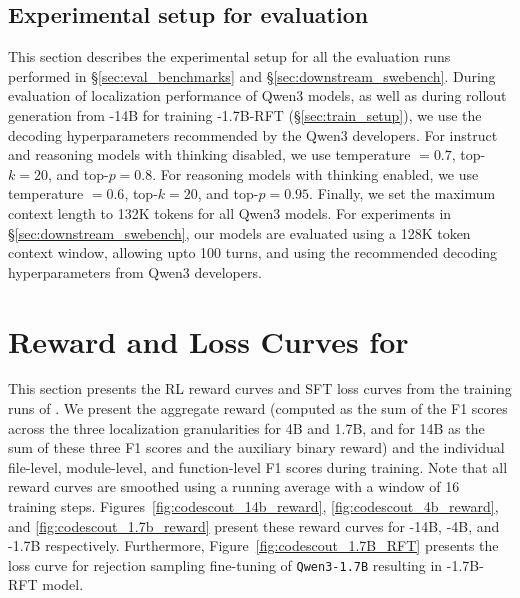 \subsection{Experimental setup for evaluation}\label{appendix:eval_hyperparams}
This section describes the experimental setup for all the evaluation runs performed in \S\ref{sec:eval_benchmarks} and \S\ref{sec:downstream_swebench}.  During evaluation of localization performance of Qwen3 models, as well as during rollout generation from \methodname-14B for training \methodname-1.7B-RFT (\S\ref{sec:train_setup}), we use the decoding hyperparameters recommended by the Qwen3 developers. For instruct and reasoning models with thinking disabled, we use temperature $=0.7$, top-$k=20$, and top-$p=0.8$. For reasoning models with thinking enabled, we use temperature $=0.6$, top-$k=20$, and top-$p=0.95$. Finally, we set the maximum context length to 132K tokens for all Qwen3 models. For experiments in \S\ref{sec:downstream_swebench}, our models are evaluated using a 128K token context window, allowing upto 100 turns, and using the recommended decoding hyperparameters from Qwen3 developers.
\section{Reward and Loss Curves for \methodname}\label{appendix:rl_loss_curves}




This section presents the RL reward curves and SFT loss curves from the training runs of \methodname. We present the aggregate reward (computed as the sum of the F1 scores across the three localization granularities for 4B and 1.7B, and for 14B as the sum of these three F1 scores and the auxiliary binary reward) and the individual file-level, module-level, and function-level F1 scores during training. Note that all reward curves are smoothed using a running average with a window of 16 training steps. Figures~\ref{fig:codescout_14b_reward}, \ref{fig:codescout_4b_reward}, and \ref{fig:codescout_1.7b_reward} present these reward curves for \methodname-14B, \methodname-4B, and \methodname-1.7B respectively. Furthermore, Figure~\ref{fig:codescout_1.7B_RFT} presents the loss curve for rejection sampling fine-tuning of \texttt{Qwen3-1.7B} resulting in \methodname-1.7B-RFT model.

